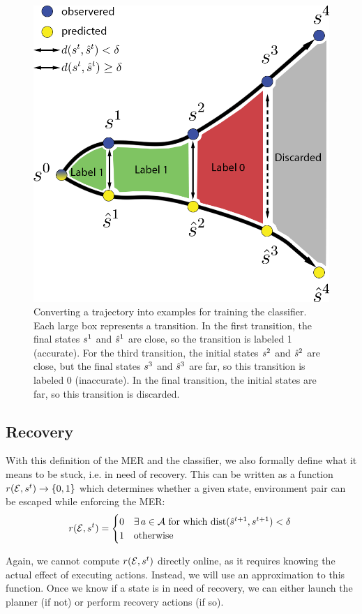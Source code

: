 \begin{figure}
    \centering
    \includegraphics[width=0.5\linewidth]{Chap2/images/figure3-v2}
    \caption{Converting a trajectory into examples for training the classifier. Each large box represents a transition. In the first transition, the final states $s^1$ and $\hat{s}^1$ are close, so the transition is labeled 1 (accurate). For the third transition, the initial states $s^2$ and $\hat{s}^2$ are close, but the final states $s^3$ and $\hat{s}^3$ are far, so this transition is labeled 0 (inaccurate). In the final transition, the initial states are far, so this transition is discarded.}
    \label{Scirob:fig:figure3}
\end{figure}

\subsection{Recovery}

With this definition of the MER and the classifier, we also formally define what it means to be stuck, i.e. in need of recovery. This can be written as a function $r(\mathcal{E},s^{t}) \rightarrow \{0,1\}$ which determines whether a given state, environment pair can be escaped while enforcing the MER: 
\begin{equation}
    r(\mathcal{E},s^{t})
    = \begin{cases}
    0 & \exists\,a \in \mathcal{A}\ \text{for which}\ \mathrm{dist}(\hat{s}^{t+1},s^{t+1}) < \delta \\
    1 & \text{otherwise}
    \end{cases} \\
    \label{Scirob:eq:recovery}
\end{equation}

Again, we cannot compute $r(\mathcal{E},s^{t})$ directly online, as it requires knowing the actual effect of executing actions. Instead, we will use an approximation to this function. Once we know if a state is in need of recovery, we can either launch the planner (if not) or perform recovery actions (if so).

